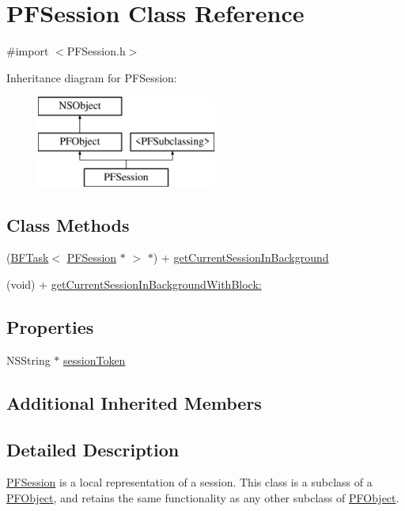\hypertarget{interface_p_f_session}{}\section{P\+F\+Session Class Reference}
\label{interface_p_f_session}


{\ttfamily \#import $<$P\+F\+Session.\+h$>$}

Inheritance diagram for P\+F\+Session\+:\begin{figure}[H]
\begin{center}
\leavevmode
\includegraphics[height=3.000000cm]{interface_p_f_session}
\end{center}
\end{figure}
\subsection*{Class Methods}
\begin{DoxyCompactItemize}
\item 
(\hyperlink{class_b_f_task}{B\+F\+Task}$<$ \hyperlink{interface_p_f_session}{P\+F\+Session} $\ast$ $>$ $\ast$) + \hyperlink{interface_p_f_session_af62aab7e41026371e28f1d41cdaf9c48}{get\+Current\+Session\+In\+Background}
\item 
(void) + \hyperlink{interface_p_f_session_ab723ab16f5965a59c4aa8c2d6b742936}{get\+Current\+Session\+In\+Background\+With\+Block\+:}
\end{DoxyCompactItemize}
\subsection*{Properties}
\begin{DoxyCompactItemize}
\item 
N\+S\+String $\ast$ \hyperlink{interface_p_f_session_a9e2e9da02a395f3b549cc0cca89e3baa}{session\+Token}
\end{DoxyCompactItemize}
\subsection*{Additional Inherited Members}


\subsection{Detailed Description}
{\ttfamily \hyperlink{interface_p_f_session}{P\+F\+Session}} is a local representation of a session. This class is a subclass of a {\ttfamily \hyperlink{interface_p_f_object}{P\+F\+Object}}, and retains the same functionality as any other subclass of {\ttfamily \hyperlink{interface_p_f_object}{P\+F\+Object}}. 

